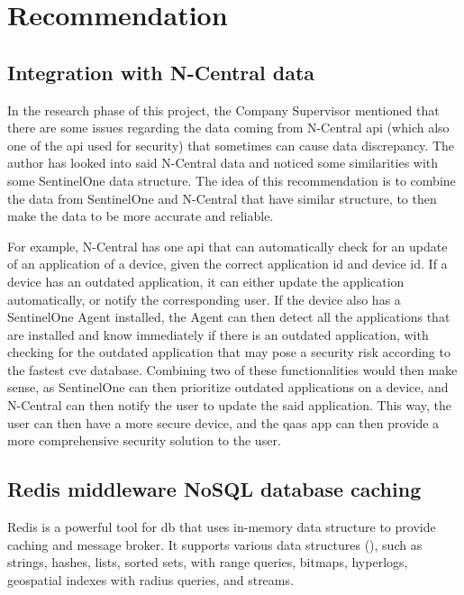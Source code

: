 \section{Recommendation}

\subsection{Integration with N-Central data}

In the research phase of this project, the Company Supervisor mentioned that there are some issues regarding the data coming
from N-Central \acrshort{api} (which also one of the \acrshort{api} used for security) that sometimes can cause data discrepancy. The author
has looked into said N-Central data and noticed some similarities with some SentinelOne data structure. The idea of this recommendation
is to combine the data from SentinelOne and N-Central that have similar structure, to then make the data to be more accurate and reliable.

For example, N-Central has one \acrshort{api} that can automatically check for an update of an application
of a device, given the correct application \acrshort{id} and device \acrshort{id}. If a device has an outdated application, it can either
update the application automatically, or notify the corresponding user. If the device also has a SentinelOne Agent installed, the Agent
can then detect all the applications that are installed and know immediately if there is an outdated application, with checking for the
outdated application that may pose a security risk according to the fastest \acrshort{cve} database. Combining two of these functionalities
would then make sense, as SentinelOne can then prioritize outdated applications on a device, and N-Central can then notify the user
to update the said application. This way, the user can then have a more secure device, and the \acrshort{qaas} app can then provide a more
comprehensive security solution to the user.

\subsection{Redis middleware NoSQL database caching}

Redis is a powerful tool for \acrshort{db} that uses in-memory data structure to provide caching and message broker. It supports
various data structures (\textit{\cite{redisDataStructure}}), such as strings, hashes, lists, sorted sets, with range queries,
bitmaps, hyperlogs, geospatial indexes with radius queries, and streams.

